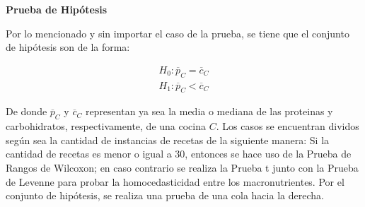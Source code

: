 \documentclass[12pt,a4paper]{article}
\begin{document}
        \textbf{Prueba de Hipótesis}\\
        {
            Por lo mencionado y sin importar el caso de la prueba, se tiene que el 
            conjunto de hipótesis son de la forma:

            \begin{align*}
                H_0 : \overline{p}_C = \overline{c}_C \\
                H_1 : \overline{p}_C < \overline{c}_C
            \end{align*}

            De donde $\overline{p}_C$ y $\overline{c}_C$ representan ya sea la media o 
            mediana de las proteinas y carbohidratos, respectivamente, de una cocina $C$. 
            Los casos se encuentran dividos según sea la cantidad de instancias de recetas 
            de la siguiente manera: Si la cantidad de recetas es menor 
            o igual a $30$, entonces se hace uso de la Prueba de Rangos de Wilcoxon; en 
            caso contrario se realiza la Prueba t junto con la Prueba de Levenne para 
            probar la homocedasticidad entre los macronutrientes. Por el conjunto de hipótesis, 
            se realiza una prueba de una cola hacia la derecha.\\
        }
\end{document}
